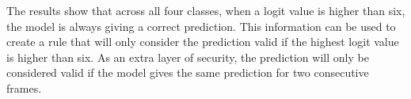 \begin{figure}[H]%
    \centering
    \begin{subfigure}[b]{0.8\columnwidth}
        {\fontsize{8}{10}\selectfont}
        \caption{\centering}
    \end{subfigure}
    \par\medskip
    \begin{subfigure}[b]{0.8\columnwidth}
        {\fontsize{8}{10}\selectfont}
        \caption{\centering}
    \end{subfigure}
    \par\medskip
    \begin{subfigure}[b]{0.8\columnwidth}
        {\fontsize{8}{10}\selectfont}
        \caption{\centering}
    \end{subfigure}
    \par\medskip
    \begin{subfigure}[b]{0.8\columnwidth}
        {\fontsize{8}{10}\selectfont}
        \caption{\centering}
    \end{subfigure}
    \caption{}
    \label{fig:logits}
\end{figure}

The results show that across all four classes, when a logit value is higher than six, the model is always giving a correct prediction. This information can be used to create a rule that will only consider the prediction valid if the highest logit value is higher than six. As an extra layer of security, the prediction will only be considered valid if the model gives the same prediction for two consecutive frames. 

